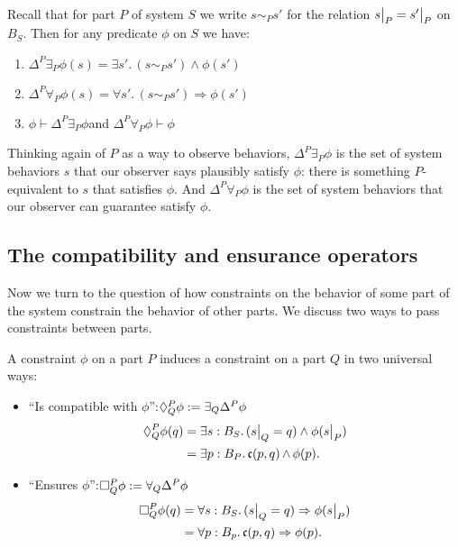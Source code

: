 \begin{lemma}\label{Thing:lem:Global.Modality.Props}
Recall that for part $P$ of system $S$ we write $s \sim_P s'$ for the relation $\rest{s}{P} = \rest{s'}{P}$ on $B_S$. Then for any predicate $\phi$ on $S$ we have:
\begin{enumerate}
    \item $\Delta^P \exists_P \phi(s) = \exists s'.\, (s\sim_P s') \wedge \phi(s')$
    \item $\Delta^P \forall_P \phi(s) = \forall s'.\, (s \sim_P s') \Rightarrow \phi(s')$
    \item $\phi \vdash \Delta^P \exists_P \phi$\quad and \quad $\Delta^P \forall_P \phi \vdash \phi$
\end{enumerate}
\end{lemma}
Thinking again of $P$ as a way to observe behaviors,
$\Delta^P \exists_P \phi$ is the set of system behaviors $s$ that our observer says plausibly satisfy $\phi$: there is something $P$-equivalent to $s$ that satisfies $\phi$. And $\Delta^P \forall_P \phi$ is the set of system behaviors that our observer can guarantee satisfy $\phi$.

\subsection{The compatibility and ensurance operators}\label{subsec.compat_ensure}
Now we turn to the question of how constraints on the behavior of some part of the system constrain the behavior of other parts. We discuss two ways to pass constraints between parts.

     \begin{defn}
        A constraint $\phi$ on a part $P$ induces a constraint on a part $Q$ in two universal ways:
        \begin{itemize}
            \item ``Is compatible with $\phi$'':\quad $\compat{P}{Q}\phi := \exists_Q \Delta^P\phi$
                \begin{align*}
               \compat{P}{Q} \phi(q) &=  \exists s : B_S.\, (\rest{s}{Q} = q) \wedge \phi(\rest{s}{P})\\
               &= \exists p : B_P.\, \mathfrak{c}(p, q) \meet \phi(p).
                \end{align*}
            \item ``Ensures $\phi$'':\quad $\ensure{P}{Q}\phi := \forall_Q  \Delta^P\phi$
                \begin{align*}
                \ensure{P}{Q} \phi(q) &= \forall s : B_S.\, (\rest{s}{Q} = q) \Rightarrow \phi(\rest{s}{P})\\
                &= \forall p : B_p.\, \mathfrak{c}(p, q) \Rightarrow \phi(p).
                \end{align*}
        \end{itemize} 
    \end{defn}
    
